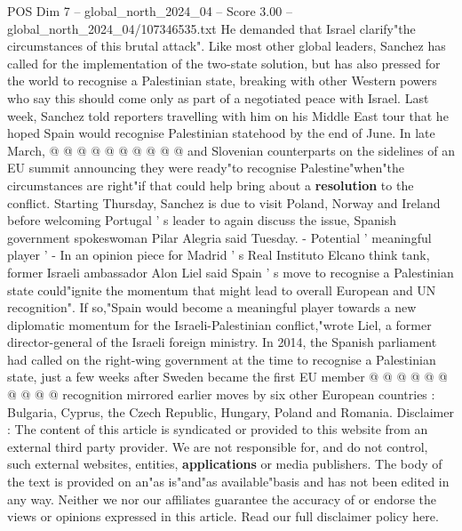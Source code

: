 \begin{textsample}{POS Dim 7 – global\_north\_2024\_04 – Score 3.00 – global\_north\_2024\_04/107346535.txt}
He demanded that Israel clarify"the circumstances of this brutal attack".
Like most other global leaders, Sanchez has called for the implementation of the two-state solution, but has also pressed for the world to recognise a Palestinian state, breaking with other Western powers who say this should come only as part of a negotiated peace with Israel.
Last week, Sanchez told reporters travelling with him on his Middle East tour that he hoped Spain would recognise Palestinian statehood by the end of June.
In late March, @ @ @ @ @ @ @ @ @ @ and Slovenian counterparts on the sidelines of an EU summit announcing they were ready"to recognise Palestine"when"the circumstances are right"if that could help bring about a \textbf{resolution} to the conflict.
Starting Thursday, Sanchez is due to visit Poland, Norway and Ireland before welcoming Portugal ' s leader to again discuss the issue, Spanish government spokeswoman Pilar Alegria said Tuesday. - Potential ' meaningful player ' - In an opinion piece for Madrid ' s Real Instituto Elcano think tank, former Israeli ambassador Alon Liel said Spain ' s move to recognise a Palestinian state could"ignite the momentum that might lead to overall European and UN recognition".
If so,"Spain would become a meaningful player towards a new diplomatic momentum for the Israeli-Palestinian conflict,"wrote Liel, a former director-general of the Israeli foreign ministry.
In 2014, the Spanish parliament had called on the right-wing government at the time to recognise a Palestinian state, just a few weeks after Sweden became the first EU member @ @ @ @ @ @ @ @ @ @ recognition mirrored earlier moves by six other European countries : Bulgaria, Cyprus, the Czech Republic, Hungary, Poland and Romania.
Disclaimer : The content of this article is syndicated or provided to this website from an external third party provider.
We are not responsible for, and do not control, such external websites, entities, \textbf{applications} or media publishers.
The body of the text is provided on an"as is"and"as available"basis and has not been edited in any way.
Neither we nor our affiliates guarantee the accuracy of or endorse the views or opinions expressed in this article.
Read our full disclaimer policy here.

\end{textsample}
